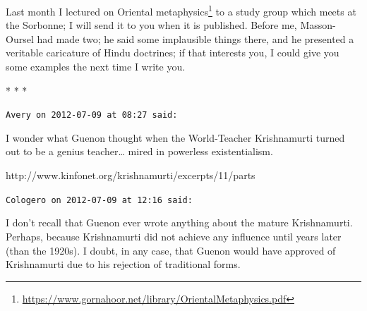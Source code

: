Last month I lectured on Oriental metaphysics\footnote{\url{https://www.gornahoor.net/library/OrientalMetaphysics.pdf}} to a study group which meets at the Sorbonne; I will send it to you when it is published. Before me, Masson-Oursel had made two; he said some implausible things there, and he presented a veritable caricature of Hindu doctrines; if that interests you, I could give you some examples the next time I write you.




\begin{center}* * *\end{center}

\begin{footnotesize}\begin{sffamily}



\texttt{Avery on 2012-07-09 at 08:27 said: }

I wonder what Guenon thought when the World-Teacher Krishnamurti turned out to be a genius teacher… mired in powerless existentialism.

http://www.kinfonet.org/krishnamurti/excerpts/11/parts


\hfill

\texttt{Cologero on 2012-07-09 at 12:16 said: }

I don't recall that Guenon ever wrote anything about the mature Krishnamurti. Perhaps, because Krishnamurti did not achieve any influence until years later (than the 1920s). I doubt, in any case, that Guenon would have approved of Krishnamurti due to his rejection of traditional forms.


\hfill


\end{sffamily}\end{footnotesize}

